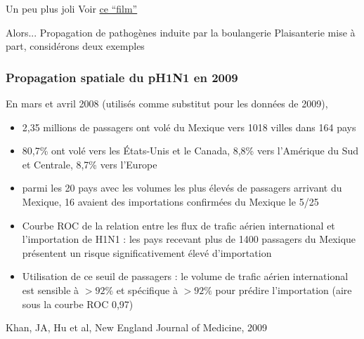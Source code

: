 \documentclass[aspectratio=169]{beamer}\usepackage[]{graphicx}\usepackage[]{xcolor}
\begin{document}
\begin{frame}{Un peu plus joli}
Voir \href{FIGS/spread-between-3-patches.gif}{ce ``film''}
\end{frame}

\begin{frame}{Alors...}
\bbullet Propagation de pathogènes induite par la boulangerie
\vfill
\bbullet Plaisanterie mise à part, considérons deux exemples
\end{frame}


\begin{frame}
\frametitle{Propagation spatiale du pH1N1 en 2009}
\nocite{KhanArinoHuRaposoEtAl2009}
	En mars et avril 2008 (utilisés comme substitut pour les données de 2009), 
	\begin{itemize}
		\item 2,35 millions de passagers ont volé du Mexique vers 1018 villes dans 164 pays
		\item 80,7\% ont volé vers les États-Unis et le Canada, 8,8\% vers l'Amérique du Sud et Centrale, 8,7\% vers l'Europe
		\item parmi les 20 pays avec les volumes les plus élevés de passagers arrivant du Mexique, 16 avaient des importations confirmées du Mexique le 5/25
		\item Courbe ROC de la relation entre les flux de trafic aérien international
		et l'importation de H1N1 : les pays recevant plus de 1400 passagers du Mexique présentent un risque significativement élevé d'importation
		\item Utilisation de ce seuil de passagers : le volume de trafic aérien international 
		est sensible à $>92\%$ et spécifique à $>92\%$ pour prédire l'importation (aire sous la courbe ROC 0,97)
	\end{itemize}
	\vfill
	\begin{flushright}
		Khan, JA, Hu et al, New England Journal of Medicine, 2009
	\end{flushright}
\end{frame}

\end{document}
